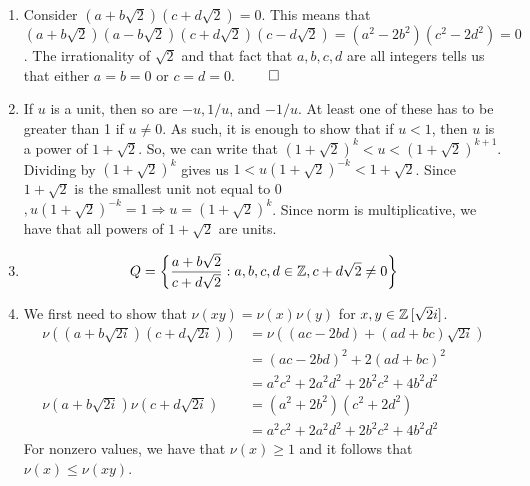 \documentclass{report}
\begin{document}
\sol
\begin{enumerate}[label=\alph*.]
	\item Consider $(a+b\sqrt{2})(c+d\sqrt{2})=0$. This means that $(a+b\sqrt{2})(a-b\sqrt{2})(c+d\sqrt{2})(c-d\sqrt{2}) =(a^2-2b^2)(c^2-2d^2) = 0$. The irrationality of $\sqrt{2}$ and that fact that $a,b,c,d$ are all integers tells us that either $a=b=0$ or $c=d=0$. $\qed$
	\item If $u$ is a unit, then so are $-u, 1/u$, and $-1/u$. At least one of these has to be greater than 1 if $u\neq 0$. As such, it is enough to show that if $u<1$, then $u$ is a power of $1+\sqrt{2}$. So, we can write that $(1+\sqrt{2})^k < u < (1+\sqrt{2})^{k+1}$. Dividing by $(1+\sqrt{2})^k$ gives us $1 < u(1+\sqrt{2})^{-k} < 1+\sqrt{2}$. Since $1+\sqrt{2}$ is the smallest unit not equal to 0$, u(1+\sqrt{2})^{-k} = 1 \Rightarrow u = (1+\sqrt{2})^k$. Since norm is multiplicative, we have that all powers of $1+\sqrt{2}$ are units.
	\item $$Q = \left\{\frac{a+b\sqrt{2}}{c+d\sqrt{2}} : a,b,c,d \in \ZZ, c+d\sqrt{2}\neq 0\right\}$$
	\item We first need to show that $\nu(xy) = \nu(x)\nu(y)$ for $x,y \in \ZZ\,[\sqrt{2}i]$. 
	\begin{align*}
		\nu((a+b\sqrt{2i})(c+d\sqrt{2i})) &= \nu((ac-2bd)+(ad+bc)\sqrt{2i}) \\
		&= (ac-2bd)^2+2(ad+bc)^2 \\
		&= a^2c^2 + 2a^2d^2 + 2b^2c^2 + 4b^2d^2 \\
		\nu(a+b\sqrt{2i})\nu(c+d\sqrt{2i}) &= (a^2+2b^2)(c^2+2d^2) \\
		&= a^2c^2 + 2a^2d^2 + 2b^2c^2 + 4b^2d^2 
	\end{align*}
	For nonzero values, we have that $\nu(x) \geq 1$ and it follows that $\nu(x) \leq \nu(xy)$. 


\end{enumerate}
\end{document}
